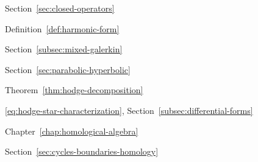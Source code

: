 \par\noindent\hspace*{0em}\label{index:graph-norm}\quad Section~\ref{sec:closed-operators}

\par\noindent\hspace*{0em}\label{index:harmonic-form}\quad Definition~\ref{def:harmonic-form}

\par\noindent\hspace*{1em}\label{index:harmonic-form-discrete}\quad Section~\ref{subsec:mixed-galerkin}

\par\noindent\hspace*{0em}\label{index:hille-yosida-phillips-theory}\quad Section~\ref{sec:parabolic-hyperbolic}

\par\noindent\hspace*{0em}\label{index:hodge-decomposition}\quad Theorem~\ref{thm:hodge-decomposition}

\par\noindent\hspace*{0em}\label{index:hodge-star}\quad \eqref{eq:hodge-star-characterization}, Section~\ref{subsec:differential-forms}

\par\noindent\hspace*{0em}\label{index:homological-algebra}\quad Chapter~\ref{chap:homological-algebra}

\par\noindent\hspace*{0em}\label{index:homology}\quad Section~\ref{sec:cycles-boundaries-homology}


